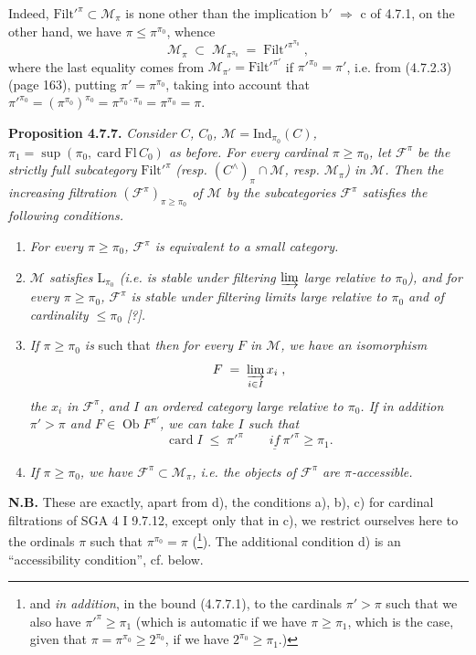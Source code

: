 \documentclass[11pt]{article}
\newcommand{\printedpage}[1]{\marginpar{\footnotesize p.~#1}}
\newcommand{\msp}[1]{\marginpar{\footnotesize [#1]}}
\newcommand{\Filt}{\mathrm{Filt}}
\newcommand{\card}{\operatorname{card}}
\newcommand{\Ob}{\operatorname{Ob}}
\newcommand{\Ind}{\mathrm{Ind}}
\begin{document}
Indeed, $\Filt'^{\pi} \subset \mathcal{M}_{\pi}$ is none other than the implication b$'$ $\Longrightarrow$ c of 4.7.1, on the other hand, we have $\pi \leqslant \pi^{\pi_0}$, whence
\[
\mathcal{M}_{\pi} \;\subset\; \mathcal{M}_{\pi^{\pi_0}} \;=\; \Filt'^{\pi^{\pi_0}} \;,
\]
where the last equality comes from $\mathcal{M}_{\pi'} = \Filt'^{\pi'}$ if $\pi'^{\pi_0} = \pi'$, i.e. from (4.7.2.3) (page 163), putting $\pi' = \pi^{\pi_0}$, taking into account that $\pi'^{\pi_0} = (\pi^{\pi_0})^{\pi_0} = \pi^{\pi_0 \cdot \pi_0} = \pi^{\pi_0} = \pi$.

\msp{page 172}
\textbf{Proposition 4.7.7.} \textit{Consider $C$, $C_0$, $\mathcal{M} = \Ind_{\pi_0}(C)$, $\pi_1 = \sup(\pi_0, \card \mathrm{Fl}\, C_0)$ as before. For every cardinal $\pi \geqslant \pi_0$, let $\mathcal{F}^{\pi}$ be the strictly full subcategory} $\Filt'^{\pi}$ \textit{(resp. $(C^{\wedge})_{\pi} \cap \mathcal{M}$, resp. $\mathcal{M}_{\pi}$) in $\mathcal{M}$. Then the increasing filtration $(\mathcal{F}^{\pi})_{\pi \geqslant \pi_0}$ of $\mathcal{M}$ by the subcategories $\mathcal{F}^{\pi}$ satisfies the following conditions.}
\begin{enumerate}
\item[\textit{a)}] \textit{For every $\pi \geqslant \pi_0$, $\mathcal{F}^{\pi}$ is equivalent to a small category.}
\item[\textit{b)}] \textit{$\mathcal{M}$ satisfies $\mathrm{L}_{\pi_0}$ (i.e. is stable under filtering $\varinjlim$ large relative to $\pi_0$), and for every $\pi \geqslant \pi_0$, $\mathcal{F}^{\pi}$ is stable under filtering limits large relative to $\pi_0$ and of cardinality $\leqslant \pi_0$ [?].}
\printedpage{58}
\item[\textit{c)}] \textit{If $\pi \geqslant \pi_0$ is} such that  \textit{then for every $F$ in $\mathcal{M}$, we have an isomorphism}
\[
F \;=\; \varinjlim_{i \in I} x_i \;,
\]
\textit{the $x_i$ in $\mathcal{F}^{\pi}$, and $I$ an ordered category large relative to $\pi_0$. If in addition $\pi' > \pi$ and $F \in \Ob F^{\pi'}$, we can take $I$ such that} %
\[
\card I \;\leqslant\; \pi'^{\pi} \qquad \underline{\textit{if}}\ \pi'^{\pi} \geqslant \pi_1. \tag*{(4.7.7.1)}
\]
\item[\textit{d)}] \textit{If $\pi \geqslant \pi_0$, we have $\mathcal{F}^{\pi} \subset \mathcal{M}_{\pi}$, i.e. the objects of $\mathcal{F}^{\pi}$ are $\pi$-accessible.}
\end{enumerate}
\textbf{N.B.} These are exactly, apart from d), the conditions a), b), c) for cardinal filtrations of SGA 4 I 9.7.12, \msp{page 173} except only that in c), we restrict ourselves here to the ordinals $\pi$ such that $\pi^{\pi_0} = \pi$ (\footnote[72]{and \textit{in addition}, in the bound (4.7.7.1), to the cardinals $\pi' > \pi$ such that we also have $\pi'^{\pi} \geqslant \pi_1$ (which is automatic if we have $\pi \geqslant \pi_1$, which is the case, given that $\pi = \pi^{\pi_0} \geqslant 2^{\pi_0}$, if we have $2^{\pi_0} \geqslant \pi_1$.)}). The additional condition d) is an ``accessibility condition'', cf. below.
\end{document}
